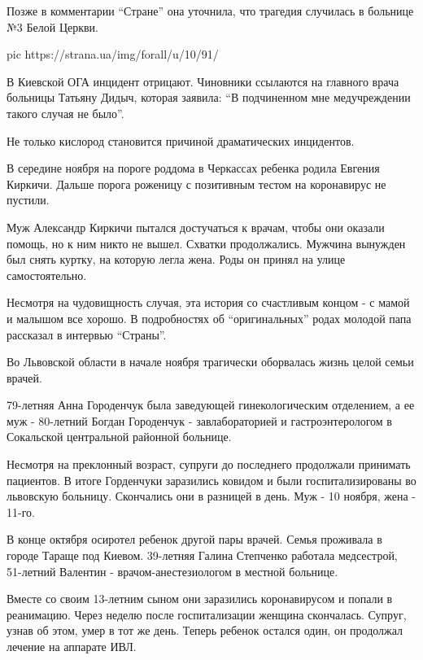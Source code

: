Позже в комментарии \enquote{Стране} она уточнила, что трагедия случилась в больнице №3
Белой Церкви. 

\ifcmt
pic https://strana.ua/img/forall/u/10/91/%
\fi

В Киевской ОГА инцидент отрицают. Чиновники ссылаются на главного врача
больницы Татьяну Дидыч, которая заявила: \enquote{В подчиненном мне медучреждении
такого случая не было}. 

Не только кислород становится причиной драматических инцидентов. 

В середине ноября на пороге роддома в Черкассах ребенка родила Евгения Киркичи.
Дальше порога роженицу с позитивным тестом на коронавирус не пустили. 

Муж Александр Киркичи пытался достучаться к врачам, чтобы они оказали помощь,
но к ним никто не вышел. Схватки продолжались. Мужчина вынужден был снять
куртку, на которую легла жена. Роды он принял на улице самостоятельно. 

Несмотря на чудовищность случая, эта история со счастливым концом - с мамой и
малышом все хорошо. В подробностях об \enquote{оригинальных} родах молодой папа
рассказал в интервью \enquote{Страны}.

Во Львовской области в начале ноября трагически оборвалась жизнь целой семьи
врачей. 

79-летняя Анна Городенчук была заведующей гинекологическим отделением, а ее муж
- 80-летний Богдан Городенчук - завлабораторией и гастроэнтерологом в
Сокальской центральной районной больнице.

Несмотря на преклонный возраст, супруги до последнего продолжали принимать
пациентов. В итоге Горденчуки заразились ковидом и были госпитализированы во
львовскую больницу. Скончались они в разницей в день. Муж - 10 ноября, жена -
11-го. 

В конце октября осиротел ребенок другой пары врачей. Семья проживала в городе
Тараще под Киевом. 39-летняя Галина Степченко работала медсестрой, 51-летний
Валентин - врачом-анестезиологом в местной больнице.

Вместе со своим 13-летним сыном они заразились коронавирусом и попали в
реанимацию. Через неделю после госпитализации женщина скончалась. Супруг, узнав
об этом, умер в тот же день. Теперь ребенок остался один, он продолжал лечение
на аппарате ИВЛ.
